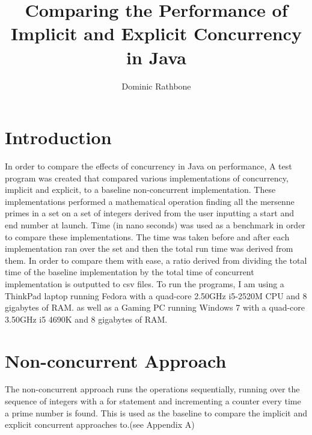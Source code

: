 \documentclass[]{report}
\title{Comparing the Performance of Implicit and Explicit Concurrency in Java}
\author{Dominic Rathbone}
\begin{document}
\maketitle

\section*{Introduction}
In order to compare the effects of concurrency in Java on performance, A test program was created that compared various implementations of concurrency, implicit and explicit, to a baseline non-concurrent implementation. These implementations performed a mathematical operation finding all the mersenne primes in a set on a set of integers derived from the user inputting a start and end number at launch. Time (in nano seconds) was used as a benchmark in order to compare these implementations. The time was taken before and after each implementation ran over the set and then the total run time was derived from them. In order to compare them with ease, a ratio derived from dividing the total time of the baseline implementation by the total time of concurrent implementation is outputted to csv files. To run the programs, I am using a ThinkPad laptop running Fedora with a quad-core 2.50GHz i5-2520M CPU and 8 gigabytes of RAM. as well as a Gaming PC running Windows 7 with a quad-core 3.50GHz i5 4690K and 8 gigabytes of RAM.

\section{Non-concurrent Approach}
The non-concurrent approach runs the operations sequentially, running over the sequence of integers with a for statement and incrementing a counter every time a prime number is found. This is used as the baseline to compare the implicit and explicit concurrent approaches to.(see Appendix A)
\end{document}
